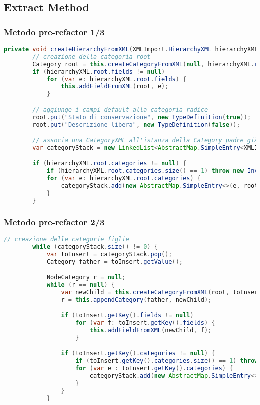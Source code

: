 \subsection{Extract Method}
\begin{frame}[fragile]
    \frametitle{Metodo pre-refactor 1/3}

    \lstset{style=tiny_java}
    \begin{lstlisting}[language=java]
private void createHierarchyFromXML(XMLImport.HierarchyXML hierarchyXML) throws DuplicateCategoryException, InvalidCategoryException, DuplicateFieldException, InvalidFieldException {
        // creazione della categoria root
        Category root = this.createCategoryFromXML(null, hierarchyXML.root);
        if (hierarchyXML.root.fields != null)
            for (var e: hierarchyXML.root.fields) {
                this.addFieldFromXML(root, e);
            }

        // aggiunge i campi default alla categoria radice
        root.put("Stato di conservazione", new TypeDefinition(true));
        root.put("Descrizione libera", new TypeDefinition(false));

        // associa una CategoryXML all'istanza della Category padre già creata
        var categoryStack = new LinkedList<AbstractMap.SimpleEntry<XMLImport.CategoryXML, Category>>();

        if (hierarchyXML.root.categories != null) {
            if (hierarchyXML.root.categories.size() == 1) throw new InvalidCategoryException();
            for (var e: hierarchyXML.root.categories) {
                categoryStack.add(new AbstractMap.SimpleEntry<>(e, root));
            }
        }
    \end{lstlisting}
\end{frame}

\begin{frame}[fragile]
    \frametitle{Metodo pre-refactor 2/3}

    \lstset{style=tiny_java}
    \begin{lstlisting}[language=java, firstnumber=23]
        // creazione delle categorie figlie
        while (categoryStack.size() != 0) {
            var toInsert = categoryStack.pop();
            Category father = toInsert.getValue();

            NodeCategory r = null;
            while (r == null) {
                var newChild = this.createCategoryFromXML(root, toInsert.getKey());
                r = this.appendCategory(father, newChild);

                if (toInsert.getKey().fields != null)
                    for (var f: toInsert.getKey().fields) {
                        this.addFieldFromXML(newChild, f);
                    }

                if (toInsert.getKey().categories != null) {
                    if (toInsert.getKey().categories.size() == 1) throw new InvalidCategoryException();
                    for (var e : toInsert.getKey().categories) {
                        categoryStack.add(new AbstractMap.SimpleEntry<>(e, newChild));
                    }
                }
            }
    \end{lstlisting}
\end{frame}

